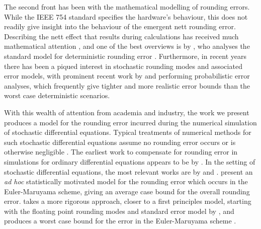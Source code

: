 \documentclass[9pt,a4paper,english]{extarticle}
\begin{document}
The second front has been with the mathematical modelling of rounding errors. While the IEEE 754 standard specifies the hardware's behaviour, this does not readily give insight into the behaviour of the emergent nett rounding error. Describing the nett effect that results during calculations has received much mathematical attention \citep{higham2002accuracy,wilkinson1961error,wilkinson1974numerical,wilkinson1986error,hull1966tests}, and one of the best overviews is by \citet{higham2002accuracy}, who analyses the standard model for deterministic rounding error \citep[2.2, (2.4)]{higham2002accuracy}. Furthermore, in recent years there has been a piqued interest in stochastic rounding modes and associated error models, with prominent recent work by \citet{higham2019new} and \citet{ipsen2019probabilistic} performing probabilistic error analyses, which frequently give tighter and more realistic error bounds than the worst case deterministic scenarios.  

With this wealth of attention from academia and industry, the work we present produces a model for the rounding error incurred during the numerical simulation of stochastic differential equations. Typical treatments of numerical methods for such stochastic differential equations assume no rounding error occurs or is otherwise negligible \citep[9.3, page~316]{kloeden1999numerical} \citep{glasserman2013monte}. The earliest work to compensate for rounding error in simulations for ordinary differential equations appears to be by \citet{vitasek1969numerical}. In the setting of stochastic differential equations, the most relevant works are by \citet{arciniega2003rounding} and \citet{omland2016mixed}. \citet{arciniega2003rounding} present an \textit{ad hoc} statistically motivated model for the rounding error which occurs in the Euler-Maruyama scheme, giving an average case bound for the overall rounding error. \citet{omland2016mixed} takes a more rigorous approach, closer to a first principles model, starting with the floating point rounding modes and standard error model by \citet{higham2002accuracy}, and produces a worst case bound for the error in the Euler-Maruyama scheme \citep[theorem~4.8]{omland2016mixed}. 
\end{document}
